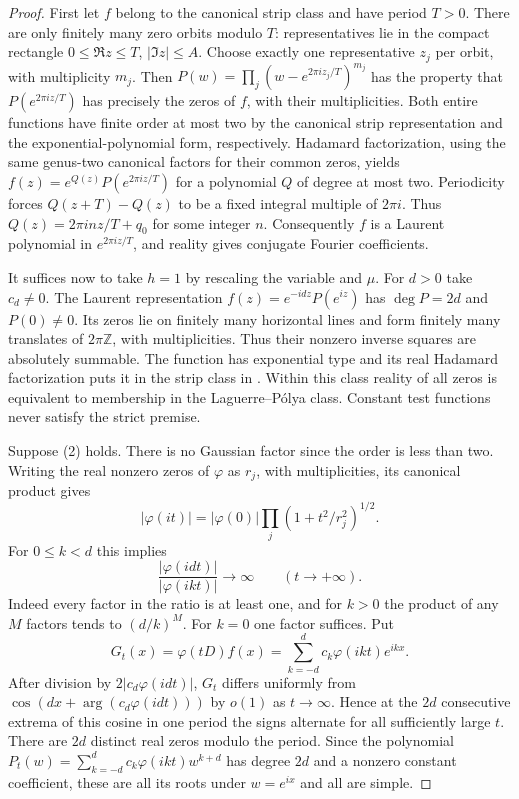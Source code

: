 \documentclass[11pt]{article}
\begin{document}
\begin{proof}
First let $f$ belong to the canonical strip class and have period $T>0$.
There are only finitely many zero orbits modulo $T$: representatives
lie in the compact rectangle $0\le\Re z\le T$, $|\Im z|\le A$.
Choose exactly one representative $z_j$ per orbit, with multiplicity
$m_j$. Then $P(w)=\prod_j(w-e^{2\pi i z_j/T})^{m_j}$ has the property
that $P(e^{2\pi iz/T})$ has precisely the zeros of $f$, with their
multiplicities. Both entire functions have finite order at most two
by the canonical strip representation and the exponential-polynomial
form, respectively. Hadamard factorization, using the same genus-two
canonical factors for their common zeros, yields
$f(z)=e^{Q(z)}P(e^{2\pi iz/T})$ for a polynomial $Q$ of degree at
most two. Periodicity forces $Q(z+T)-Q(z)$ to be a fixed integral
multiple of $2\pi i$. Thus $Q(z)=2\pi i n z/T+q_0$ for some integer
$n$. Consequently $f$ is a Laurent polynomial in $e^{2\pi iz/T}$,
and reality gives conjugate Fourier coefficients.

It suffices now to take $h=1$ by rescaling the variable and $\mu$. For $d>0$ take $c_d\ne0$. The Laurent representation
$f(z)=e^{-idz}P(e^{iz})$ has $\deg P=2d$ and $P(0)\ne0$.
Its zeros lie on finitely many horizontal lines and form finitely
many translates of $2\pi\mathbb Z$, with multiplicities. Thus their
nonzero inverse squares are absolutely summable. The function has
exponential type and its real Hadamard factorization puts it in the
strip class in \cite{ce}. Within this class reality of all zeros is
equivalent to membership in the Laguerre--P\'olya class. Constant
test functions never satisfy the strict premise.

Suppose (2) holds. There is no Gaussian factor since the order is
less than two. Writing the real nonzero zeros of $\varphi$ as $r_j$,
with multiplicities, its canonical product gives
\[
 |\varphi(it)|=|\varphi(0)|\prod_j(1+t^2/r_j^2)^{1/2}.
\]
For $0\le k<d$ this implies
\[
 \frac{|\varphi(idt)|}{|\varphi(ikt)|}\longrightarrow\infty
 \qquad(t\longrightarrow+\infty).
\]
Indeed every factor in the ratio is at least one, and for $k>0$
the product of any $M$ factors tends to $(d/k)^M$. For $k=0$
one factor suffices. Put
\[
 G_t(x)=\varphi(tD)f(x)
       =\sum_{k=-d}^d c_k\varphi(ikt)e^{ikx}.
\]
After division by $2|c_d\varphi(idt)|$, $G_t$ differs uniformly from
$\cos(dx+\arg(c_d\varphi(idt)))$ by $o(1)$ as $t\to\infty$.
Hence at the $2d$ consecutive extrema of this cosine in one period
the signs alternate for all sufficiently large $t$. There are
$2d$ distinct real zeros modulo the period. Since the polynomial
$P_t(w)=\sum_{k=-d}^d c_k\varphi(ikt)w^{k+d}$ has degree $2d$
and a nonzero constant coefficient, these are all its roots under
$w=e^{ix}$ and all are simple.


\end{proof}
\end{document}
